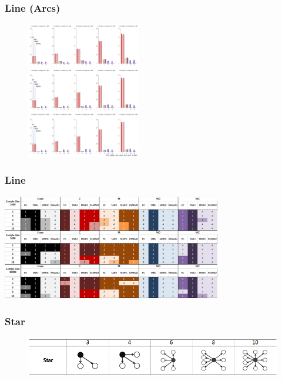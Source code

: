 \documentclass{beamer}
\begin{document}
\begin{frame}
\frametitle{Line (Arcs)}
{\scriptsize{}
	\begin{figure}
		\includegraphics[height=170pt]{images/02_Line_Arcs}
	\end{figure}	
}
\end{frame}



\begin{frame}
\frametitle{Line}
{\scriptsize{}
	\begin{center}
		\includegraphics[height=130pt]{images/Result_Line}
	\end{center}
}
\end{frame}



\begin{frame}
\frametitle{Star}
{\scriptsize{}
	\begin{figure}
		\includegraphics[height=50pt]{images/Topologies_Star}
	\end{figure}	
}
\end{frame}
\end{document}
